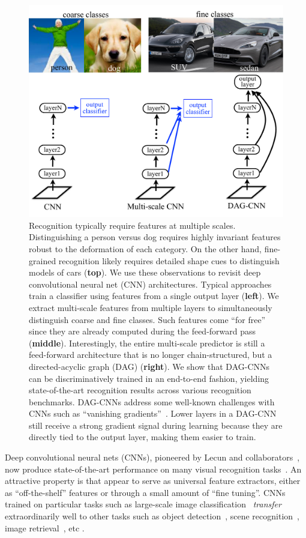 \documentclass[10pt,twocolumn,letterpaper]{article}
\begin{document}
\begin{figure}[t!]
\centering
\includegraphics[width=\columnwidth]{fig/deva_splash}
\caption{Recognition typically require features at multiple scales. Distinguishing a person versus dog requires highly invariant features robust to the deformation of each category. On the other hand, fine-grained recognition likely requires detailed shape cues to distinguish models of cars ({\bf top}). We use these observations to revisit deep convolutional neural net (CNN) architectures. Typical approaches train a classifier using features from a single output layer ({\bf left}). We extract multi-scale features from multiple layers to simultaneously distinguish coarse and fine classes. Such features come ``for free'' since they are already computed during the feed-forward pass ({\bf middle}). Interestingly, the entire multi-scale predictor is still a feed-forward architecture that is no longer chain-structured, but a directed-acyclic graph (DAG) ({\bf right}). We show that DAG-CNNs can be discriminatively trained in an end-to-end fashion, yielding state-of-the-art recognition results across various recognition benchmarks.  DAG-CNNs address some well-known challenges with CNNs such as ``vanishing gradients''~\cite{bengio1994learning}. Lower layers in a DAG-CNN still receive a strong gradient signal during learning because they are directly tied to the output layer, making them easier to train.
\label{fig:splash}}
\end{figure}

Deep convolutional neural nets (CNNs), pioneered by Lecun and collaborators~\cite{lecun1998gradient}, now produce state-of-the-art performance on many visual recognition tasks~\cite{AlexNet, overfeat, veryDeep, GoogLeNet, nin}. An attractive property is that appear to serve as universal feature extractors, either as ``off-the-shelf'' features or through a small amount of ``fine tuning''. CNNs trained on particular tasks such as large-scale image classification~\cite{ImageNet} {\em transfer} extraordinarily well to other tasks such as object detection~\cite{rcnn}, scene recognition~\cite{zhoulearning}, image retrieval~\cite{Gong14}, etc \cite{cnn_baseline}.
\end{document}
